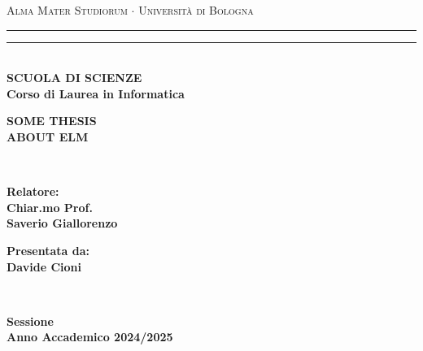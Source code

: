 \begin{titlepage}
    \begin{center}
        {{\Large{\textsc{Alma Mater Studiorum $\cdot$ Università di Bologna}}}}
        \rule[0.1cm]{\textwidth}{0.1mm}
        \rule[0.5cm]{\textwidth}{0.6mm}\\
        {\small{\bf SCUOLA DI SCIENZE\\
            Corso di Laurea in Informatica}}
    \end{center}

    \vspace{25mm}

    \begin{center}
        {\LARGE{\bf SOME THESIS }}\\
        \vspace{3mm}
        {\LARGE{\bf ABOUT ELM }}\\
    \end{center}

    \vspace{60mm}
    \par
    \noindent
    \begin{minipage}[t]{0.04\textwidth}
        ~
    \end{minipage}
    \begin{minipage}[t]{0.4\textwidth}
        \large{\bf Relatore:\\
            Chiar.mo Prof.\\
            Saverio Giallorenzo}
        \vspace{3mm}\\
    \end{minipage}
    \hfill
    \begin{minipage}[t]{0.4\textwidth}\raggedleft
        {\large{\bf Presentata da:\\
                Davide Cioni}}
    \end{minipage}
    \begin{minipage}[t]{0.04\textwidth}
        ~
    \end{minipage}

    \vspace{30mm}

    \begin{center}
        {\large{\bf {} Sessione\\
                Anno Accademico 2024/2025 }}
    \end{center}
\end{titlepage}
